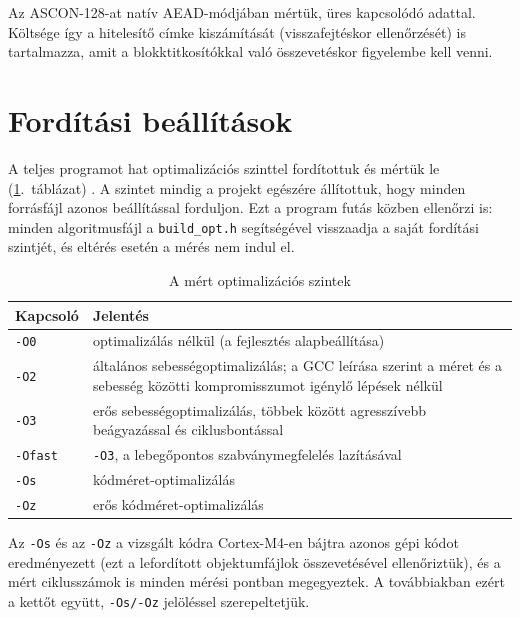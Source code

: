 \documentclass[a4paper,12pt]{report}
\theoremstyle{definition}
\theoremstyle{remark}
\begin{document}
Az ASCON-128-at natív AEAD-módjában mértük, üres kapcsolódó adattal. Költsége így a hitelesítő címke kiszámítását (visszafejtéskor ellenőrzését) is tartalmazza, amit a blokktitkosítókkal való összevetéskor figyelembe kell venni.

\section{Fordítási beállítások}\label{sec:forditas}

A teljes programot hat optimalizációs szinttel fordítottuk és mértük le (\ref{tab:build_config}.~táblázat) \cite{GCCopt}. A szintet mindig a projekt egészére állítottuk, hogy minden forrásfájl azonos beállítással forduljon. Ezt a program futás közben ellenőrzi is: minden algoritmusfájl a \texttt{build\_opt.h} segítségével visszaadja a saját fordítási szintjét, és eltérés esetén a mérés nem indul el.

\begin{table}[htbp]
    \centering
    \small
    \caption{A mért optimalizációs szintek}
    \label{tab:build_config}
    \begin{tabular}{|l|p{11cm}|}
        \hline
        \textbf{Kapcsoló} & \textbf{Jelentés} \\ \hline
        \texttt{-O0} & optimalizálás nélkül (a fejlesztés alapbeállítása) \\ \hline
        \texttt{-O2} & általános sebességoptimalizálás; a GCC leírása szerint a méret és a sebesség közötti kompromisszumot igénylő lépések nélkül \\ \hline
        \texttt{-O3} & erős sebességoptimalizálás, többek között agresszívebb beágyazással és ciklusbontással \\ \hline
        \texttt{-Ofast} & \texttt{-O3}, a lebegőpontos szabványmegfelelés lazításával \\ \hline
        \texttt{-Os} & kódméret-optimalizálás \\ \hline
        \texttt{-Oz} & erős kódméret-optimalizálás \\ \hline
    \end{tabular}
\end{table}

Az \texttt{-Os} és az \texttt{-Oz} a vizsgált kódra Cortex-M4-en bájtra azonos gépi kódot eredményezett (ezt a lefordított objektumfájlok összevetésével ellenőriztük), és a mért ciklusszámok is minden mérési pontban megegyeztek. A továbbiakban ezért a kettőt együtt, \texttt{-Os/-Oz} jelöléssel szerepeltetjük.
\end{document}
